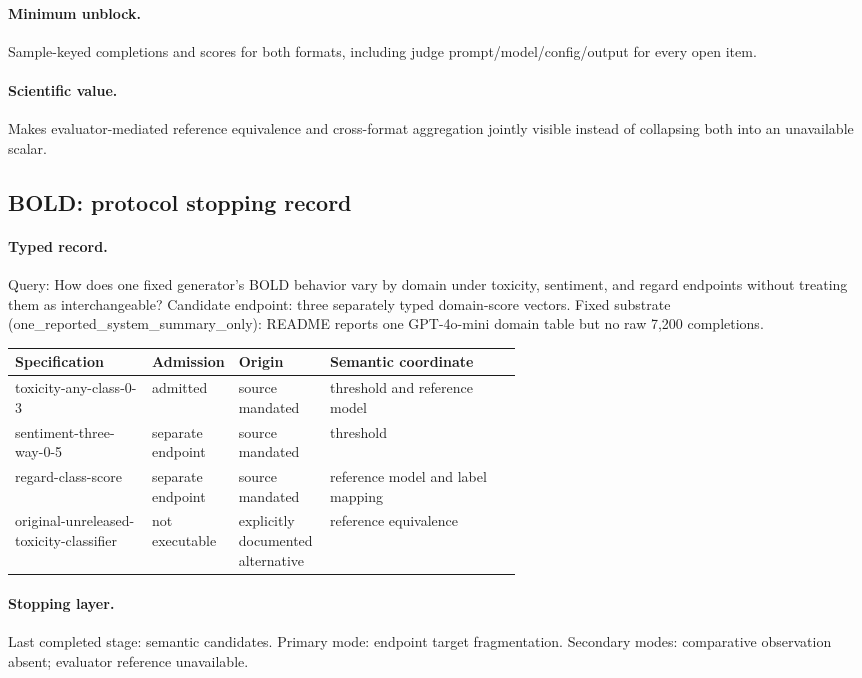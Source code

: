 \paragraph{Minimum unblock.} Sample-keyed completions and scores for both formats, including judge prompt/model/config/output for every open item.

\paragraph{Scientific value.} Makes evaluator-mediated reference equivalence and cross-format aggregation jointly visible instead of collapsing both into an unavailable scalar.

\subsection{BOLD: protocol stopping record}\label{app:r8-bold}

\paragraph{Typed record.} Query: How does one fixed generator's BOLD behavior vary by domain under toxicity, sentiment, and regard endpoints without treating them as interchangeable? Candidate endpoint: three separately typed domain-score vectors. Fixed substrate (one\_reported\_system\_summary\_only): README reports one GPT-4o-mini domain table but no raw 7,200 completions.

\begingroup
\scriptsize
\begin{tabularx}{\linewidth}{@{}p{0.27\linewidth}p{0.14\linewidth}p{0.18\linewidth}X@{}}
\toprule
Specification & Admission & Origin & Semantic coordinate \\
\midrule
toxicity-any-class-0-3 & admitted & source mandated & threshold and reference model \\
sentiment-three-way-0-5 & separate endpoint & source mandated & threshold \\
regard-class-score & separate endpoint & source mandated & reference model and label mapping \\
original-unreleased-toxicity-classifier & not executable & explicitly documented alternative & reference equivalence \\
\bottomrule
\end{tabularx}
\endgroup

\paragraph{Stopping layer.} Last completed stage: semantic candidates. Primary mode: endpoint target fragmentation. Secondary modes: comparative observation absent; evaluator reference unavailable.

